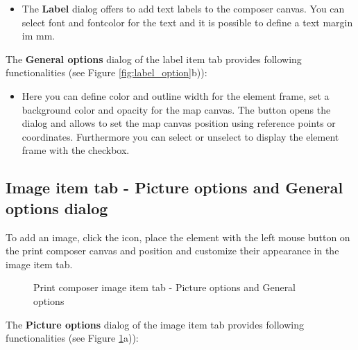 \begin{itemize}[label=--]
\item The \textbf{Label} dialog offers to add text labels to the composer
canvas. You can select font and fontcolor for the text and it is possible to
define a text margin im mm.
\end{itemize}


The \textbf{General options} dialog of the label item tab provides following
functionalities (see Figure \ref{fig:label_option}b)):

\begin{itemize}[label=--]
\item Here you can define color and outline width for the element frame, set
a background color and opacity for the map canvas. The 
button opens the  dialog and allows to set the map
canvas position using reference points or coordinates. Furthermore you can
select or unselect to display the element frame with the  checkbox.
\end{itemize}

\subsection{Image item tab - Picture options and General options dialog}

To add an image, click the 
icon, place the element with the left mouse button on the print composer
canvas and position and customize their appearance in the image item tab.

\begin{figure}[ht]
\centering
     \hspace{1cm}
   \caption{Print composer image item tab - Picture options and General options \nixcaption}\label{fig:imageoptions}
\end{figure}


The \textbf{Picture options} dialog of the image item tab provides following
functionalities (see Figure \ref{fig:imageoptions}a)):

